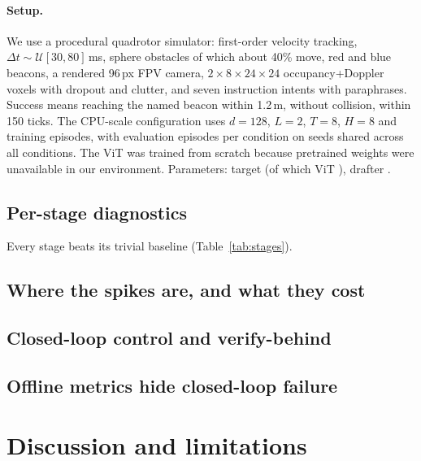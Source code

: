 \documentclass[12pt]{article}
\begin{document}
\paragraph{Setup.} We use a procedural quadrotor simulator: first-order velocity tracking, $\Delta t\sim\mathcal{U}[30,80]$\,ms, \nceNObs{} sphere obstacles of which about 40\% move, red and blue beacons, a rendered 96\,px FPV camera, $2\times8\times24\times24$ occupancy+Doppler voxels with dropout and clutter, and seven instruction intents with paraphrases. Success means reaching the named beacon within 1.2\,m, without collision, within 150 ticks. The CPU-scale configuration uses $d{=}128$, $L{=}2$, $T{=}8$, $H{=}8$ and \nceNCache{} training episodes, with \nceEvalEps{} evaluation episodes per condition on seeds shared across all conditions. The ViT was trained from scratch because pretrained weights were unavailable in our environment. Parameters: target \nceParamsTarget{} (of which ViT \nceParamsVit{}), drafter \nceParamsDrafter.

\subsection{Per-stage diagnostics}

Every stage beats its trivial baseline (Table~\ref{tab:stages}).

\subsection{Where the spikes are, and what they cost}\label{sec:neuro}


\nceNeuroText

\subsection{Closed-loop control and verify-behind}

\nceClosedText

\subsection{Offline metrics hide closed-loop failure}

\nceDiagText

\section{Discussion and limitations}\label{sec:limits}
\nceDiscussionText
\end{document}
